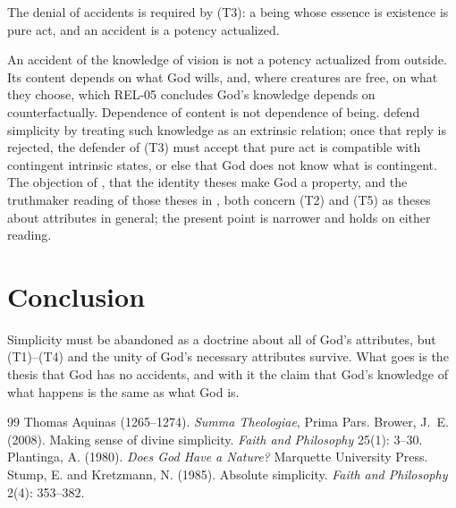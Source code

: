 \documentclass{situationist-preprint}
\begin{document}
\begin{objection}
The denial of accidents is required by (T3): a being whose essence is existence is pure act, and an accident is a potency actualized.
\end{objection}

\begin{reply}
An accident of the knowledge of vision is not a potency actualized from outside. Its content depends on what God wills, and, where creatures are free, on what they choose, which REL-05 concludes God's knowledge depends on counterfactually. Dependence of content is not dependence of being. \citet{StumpKretzmann1985} defend simplicity by treating such knowledge as an extrinsic relation; once that reply is rejected, the defender of (T3) must accept that pure act is compatible with contingent intrinsic states, or else that God does not know what is contingent. The objection of \citet{Plantinga1980}, that the identity theses make God a property, and the truthmaker reading of those theses in \citet{Brower2008}, both concern (T2) and (T5) as theses about attributes in general; the present point is narrower and holds on either reading.
\end{reply}

\section{Conclusion}

Simplicity must be abandoned as a doctrine about all of God's attributes, but (T1)--(T4) and the unity of God's necessary attributes survive. What goes is the thesis that God has no accidents, and with it the claim that God's knowledge of what happens is the same as what God is.

\begin{thebibliography}{99}\small
{} Thomas Aquinas (1265--1274). \emph{Summa Theologiae}, Prima Pars.
 Brower, J.~E. (2008). Making sense of divine simplicity. \emph{Faith and Philosophy} 25(1): 3--30.
 Plantinga, A. (1980). \emph{Does God Have a Nature?} Marquette University Press.
 Stump, E. and Kretzmann, N. (1985). Absolute simplicity. \emph{Faith and Philosophy} 2(4): 353--382.
\end{thebibliography}
\end{document}
